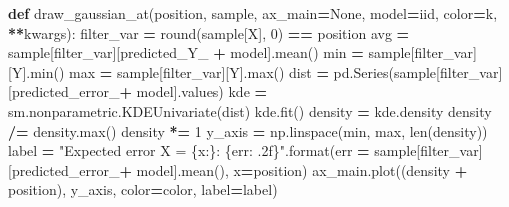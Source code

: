 \documentclass[
]{book}
\newenvironment{Shaded}{\begin{snugshade}}{\end{snugshade}}
\newcommand{\BuiltInTok}[1]{#1}
\newcommand{\DecValTok}[1]{\textcolor[rgb]{0.00,0.00,0.81}{#1}}
\newcommand{\KeywordTok}[1]{\textcolor[rgb]{0.13,0.29,0.53}{\textbf{#1}}}
\newcommand{\NormalTok}[1]{#1}
\newcommand{\OperatorTok}[1]{\textcolor[rgb]{0.81,0.36,0.00}{\textbf{#1}}}
\newcommand{\SpecialCharTok}[1]{\textcolor[rgb]{0.00,0.00,0.00}{#1}}
\newcommand{\StringTok}[1]{\textcolor[rgb]{0.31,0.60,0.02}{#1}}
\newcommand{\VariableTok}[1]{\textcolor[rgb]{0.00,0.00,0.00}{#1}}
\theoremstyle{definition}
\theoremstyle{definition}
\theoremstyle{definition}
\theoremstyle{remark}
\begin{document}
\begin{Shaded}
\begin{Highlighting}[]
\KeywordTok{def}\NormalTok{ draw\_gaussian\_at(position, sample, ax\_main}\OperatorTok{=}\VariableTok{None}\NormalTok{, model}\OperatorTok{=}\StringTok{\textquotesingle{}iid\textquotesingle{}}\NormalTok{, color}\OperatorTok{=}\StringTok{\textquotesingle{}k\textquotesingle{}}\NormalTok{, }\OperatorTok{**}\NormalTok{kwargs):}
\NormalTok{    filter\_var }\OperatorTok{=} \BuiltInTok{round}\NormalTok{(sample[}\StringTok{\textquotesingle{}X\textquotesingle{}}\NormalTok{], }\DecValTok{0}\NormalTok{) }\OperatorTok{==}\NormalTok{ position}
\NormalTok{    avg }\OperatorTok{=}\NormalTok{ sample[filter\_var][}\StringTok{\textquotesingle{}predicted\_Y\_\textquotesingle{}} \OperatorTok{+}\NormalTok{ model].mean()}
    \BuiltInTok{min} \OperatorTok{=}\NormalTok{ sample[filter\_var][}\StringTok{\textquotesingle{}Y\textquotesingle{}}\NormalTok{].}\BuiltInTok{min}\NormalTok{()}
    \BuiltInTok{max} \OperatorTok{=}\NormalTok{ sample[filter\_var][}\StringTok{\textquotesingle{}Y\textquotesingle{}}\NormalTok{].}\BuiltInTok{max}\NormalTok{()}
\NormalTok{    dist }\OperatorTok{=}\NormalTok{ pd.Series(sample[filter\_var][}\StringTok{\textquotesingle{}predicted\_error\_\textquotesingle{}}\OperatorTok{+}\NormalTok{ model].values)}
\NormalTok{    kde }\OperatorTok{=}\NormalTok{ sm.nonparametric.KDEUnivariate(dist)}
\NormalTok{    kde.fit()}
\NormalTok{    density }\OperatorTok{=}\NormalTok{ kde.density}
\NormalTok{    density }\OperatorTok{/=}\NormalTok{ density.}\BuiltInTok{max}\NormalTok{()}
\NormalTok{    density }\OperatorTok{*=} \DecValTok{1}
\NormalTok{    y\_axis }\OperatorTok{=}\NormalTok{ np.linspace(}\BuiltInTok{min}\NormalTok{, }\BuiltInTok{max}\NormalTok{, }\BuiltInTok{len}\NormalTok{(density))}
\NormalTok{    label }\OperatorTok{=} \StringTok{"Expected error X = }\SpecialCharTok{\{x:\}}\StringTok{: }\SpecialCharTok{\{err: .2f\}}\StringTok{"}\NormalTok{.}\BuiltInTok{format}\NormalTok{(err }\OperatorTok{=}\NormalTok{ sample[filter\_var][}\StringTok{\textquotesingle{}predicted\_error\_\textquotesingle{}}\OperatorTok{+}\NormalTok{ model].mean(),}
\NormalTok{                                                         x}\OperatorTok{=}\NormalTok{position)}
\NormalTok{    ax\_main.plot((density }\OperatorTok{+}\NormalTok{ position), y\_axis, color}\OperatorTok{=}\NormalTok{color, label}\OperatorTok{=}\NormalTok{label)}


\end{Highlighting}
\end{Shaded}
\end{document}
